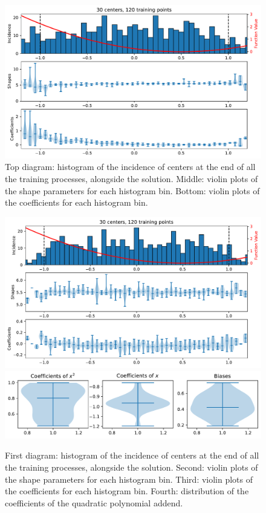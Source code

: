 \documentclass[12pt]{report} %
\begin{document}
\begin{figure}
  \includegraphics[width=\textwidth]{imagenes/experiments/1d/ode/C30-TR120-poly-1.pdf}
  \caption{Top diagram: histogram of the incidence of centers at the end of all the training processes, alongside the solution. Middle: violin plots of the shape parameters for each histogram bin. Bottom: violin plots of the coefficients for each histogram bin.}
  \label{fig:tripleplot-ode-poly-1}
\end{figure}

\begin{figure}
  \includegraphics[width=\textwidth]{imagenes/experiments/1d/ode/C30-TR120-poly2.pdf}
  \includegraphics[width=\textwidth]{imagenes/experiments/1d/ode/histogram_of_coefficients.pdf}
  \caption{First diagram: histogram of the incidence of centers at the end of all the training processes, alongside the solution. Second: violin plots of the shape parameters for each histogram bin. Third: violin plots of the coefficients for each histogram bin. Fourth: distribution of the coefficients of the quadratic polynomial addend.}
  \label{fig:tripleplot-ode-poly2}
\end{figure}
\end{document}
